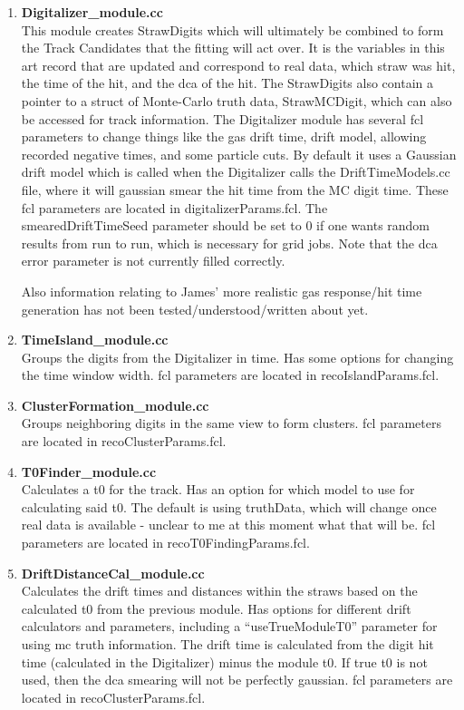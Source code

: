 \documentclass{article}
\begin{document}
    \begin{enumerate}

          \item{\bf{Digitalizer\_module.cc}} \\
          This module creates StrawDigits which will ultimately be combined to form the Track Candidates that the fitting will act over. It is the variables in this art record that are updated and correspond to real data, which straw was hit, the time of the hit, and the dca of the hit. The StrawDigits also contain a pointer to a struct of Monte-Carlo truth data, StrawMCDigit, which can also be accessed for track information. The Digitalizer module has several fcl parameters to change things like the gas drift time, drift model, allowing recorded negative times, and some particle cuts. By default it uses a Gaussian drift model which is called when the Digitalizer calls the DriftTimeModels.cc file, where it will gaussian smear the hit time from the MC digit time. These fcl parameters are located in digitalizerParams.fcl. The smearedDriftTimeSeed parameter should be set to 0 if one wants random results from run to run, which is necessary for grid jobs. Note that the dca error parameter is not currently filled correctly. 

          Also information relating to James' more realistic gas response/hit time generation has not been tested/understood/written about yet.

          \item{\bf{TimeIsland\_module.cc}} \\
          Groups the digits from the Digitalizer in time. Has some options for changing the time window width. fcl parameters are located in recoIslandParams.fcl.

          \item{\bf{ClusterFormation\_module.cc}} \\
          Groups neighboring digits in the same view to form clusters. fcl parameters are located in recoClusterParams.fcl.

          \item{\bf{T0Finder\_module.cc}} \\
          Calculates a t0 for the track. Has an option for which model to use for calculating said t0. The default is using truthData, which will change once real data is available - unclear to me at this moment what that will be. fcl parameters are located in recoT0FindingParams.fcl.

          \item{\bf{DriftDistanceCal\_module.cc}} \\
          Calculates the drift times and distances within the straws based on the calculated t0 from the previous module. Has options for different drift calculators and parameters, including a ``useTrueModuleT0'' parameter for using mc truth information. The drift time is calculated from the digit hit time (calculated in the Digitalizer) minus the module t0. If true t0 is not used, then the dca smearing will not be perfectly gaussian. fcl parameters are located in recoClusterParams.fcl.


\end{enumerate}
\end{document}
